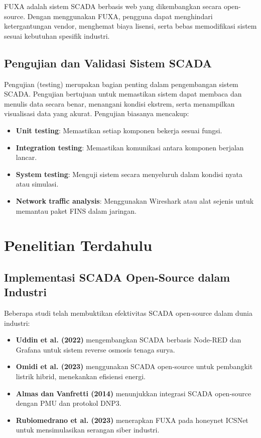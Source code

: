 FUXA adalah sistem SCADA berbasis web yang dikembangkan secara open-source. Dengan menggunakan FUXA, pengguna dapat menghindari ketergantungan vendor, menghemat biaya lisensi, serta bebas memodifikasi sistem sesuai kebutuhan spesifik industri.

\subsection{Pengujian dan Validasi Sistem SCADA}
Pengujian (testing) merupakan bagian penting dalam pengembangan sistem SCADA. Pengujian bertujuan untuk memastikan sistem dapat membaca dan menulis data secara benar, menangani kondisi ekstrem, serta menampilkan visualisasi data yang akurat. Pengujian biasanya mencakup:

\begin{itemize}
    \item \textbf{Unit testing}: Memastikan setiap komponen bekerja sesuai fungsi.
    \item \textbf{Integration testing}: Memastikan komunikasi antara komponen berjalan lancar.
    \item \textbf{System testing}: Menguji sistem secara menyeluruh dalam kondisi nyata atau simulasi.
    \item \textbf{Network traffic analysis}: Menggunakan Wireshark atau alat sejenis untuk memantau paket FINS dalam jaringan.
\end{itemize}

\section{Penelitian Terdahulu}

\subsection{Implementasi SCADA Open-Source dalam Industri}
Beberapa studi telah membuktikan efektivitas SCADA open-source dalam dunia industri:

\begin{itemize}
\item \textbf{Uddin et al. (2022)} mengembangkan SCADA berbasis Node-RED dan Grafana untuk sistem reverse osmosis tenaga surya.
\item \textbf{Omidi et al. (2023)} menggunakan SCADA open-source untuk pembangkit listrik hibrid, menekankan efisiensi energi.
\item \textbf{Almas dan Vanfretti (2014)} menunjukkan integrasi SCADA open-source dengan PMU dan protokol DNP3.
\item \textbf{Rubiomedrano et al. (2023)} menerapkan FUXA pada honeynet ICSNet untuk mensimulasikan serangan siber industri.
\end{itemize}

